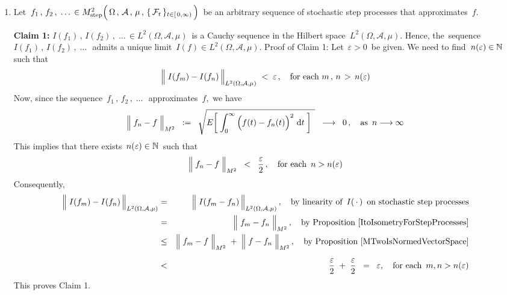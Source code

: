 \begin{enumerate}
\item
	Let
	\,$f_{1}\,,\, f_{2}\,,\; \ldots\, \in M^{2}_{\textnormal{step}}\!
	\left(\,
		\overset{{\color{white}.}}{\Omega} \,,\, \mathcal{A} \,,\, \mu \,,\, \{\,\mathcal{F}_{t}\,\}_{t \in [\,0,\infty)}
		\,\right)$\,
	be an arbitrary sequence of stochastic step processes that approximates \,$f$.
	
	\vskip 0.3cm
	\textbf{Claim 1:}\quad
	$I(f_{1})\,,\, I(f_{2})\,,\; \ldots\, \in L^{2}(\Omega,\mathcal{A},\mu)$\, is a Cauchy sequence
	in the Hilbert space \,$L^{2}(\Omega,\mathcal{A},\mu)$.\;
	Hence, the \,sequence $I(f_{1})\,,\, I(f_{2})\,,\; \ldots\,$\, admits a unique limit
	\,$I(f) \in L^{2}(\Omega,\mathcal{A},\mu)$.
	\vskip 0.2cm
	\noindent
	Proof of Claim 1:\quad
	Let \,$\varepsilon > 0$\, be given.
	We need to find \,$n(\varepsilon) \in \mathbb{N}$\, such that
	\begin{equation*}
	\left\Vert\; I(f_{m}) \overset{{\color{white}.}}{-} I(f_{n}) \,\right\Vert_{L^{2}(\Omega,\mathcal{A},\mu)} \; < \; \varepsilon\,,
	\quad\textnormal{for each $m \,,\, n \, > \, n(\varepsilon)$}
	\end{equation*}
	Now, since the sequence \,$f_{1}\,,\, f_{2}\,,\; \ldots\,$\, approximates \,$f$,\,
	we have
	\begin{equation*}
	\left\Vert\; f_{n} \overset{{\color{white}.}}{-} f \;\right\Vert_{M^{2}}
	\;\; := \;\;
	\sqrt{E\!\left[\;\int_{0}^{\infty}\left(f(t)\overset{{\color{white}.}}{-}f_{n}(t)\right)^{2}\,\d t\;\right]{\color{white}.}}
	\;\; \longrightarrow \;\; 0\,,
	\quad
	\textnormal{as \,$n \longrightarrow \infty$}
	\end{equation*}
	This implies that there exists \,$n(\varepsilon) \in \mathbb{N}$\, such that
	\begin{equation*}
	\left\Vert\; f_{n} \overset{{\color{white}.}}{-} f \;\right\Vert_{M^{2}}
	\;\; < \;\;
		\dfrac{\varepsilon}{2}\,,
	\quad
	\textnormal{for each \,$n > n(\varepsilon)$}
	\end{equation*}
	Consequently,
	\begin{eqnarray*}
	\left\Vert\; I(f_{m}) \overset{{\color{white}.}}{-} I(f_{n}) \,\right\Vert_{L^{2}(\Omega,\mathcal{A},\mu)}
	& = &
		\left\Vert\; I(f_{m} \overset{{\color{white}.}}{-} f_{n}) \,\right\Vert_{L^{2}(\Omega,\mathcal{A},\mu)},
		\quad
		\textnormal{by linearity of \,$I(\,\cdot\,)$\, on stochastic step processes}
	\\
	& = &
		\left\Vert\; f_{m} \overset{{\color{white}.}}{-} f_{n} \;\right\Vert_{M^{2}},
		\quad
		\textnormal{by Proposition \ref{ItoIsometryForStepProcesses}}
	\\
	& \leq &
		\left\Vert\; f_{m} \overset{{\color{white}.}}{-} f \;\right\Vert_{M^{2}}
		\; + \;
		\left\Vert\; f \overset{{\color{white}.}}{-} f_{n} \;\right\Vert_{M^{2}},
		\quad
		\textnormal{by Proposition \ref{MTwoIsNormedVectorSpace}}
	\\
	& \overset{{\color{white}\textnormal{\Large$1$}}}{<} &
		\dfrac{\varepsilon}{2} \; + \; \dfrac{\varepsilon}{2}
	\;\; = \;\;
		\varepsilon,
	\quad
	\textnormal{for each \,$m, n > n(\varepsilon)$}
	\end{eqnarray*}
	This proves Claim 1.
	

\end{enumerate}
